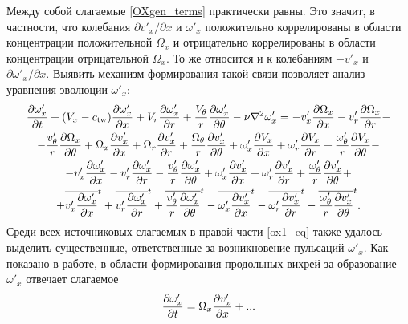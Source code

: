 Между собой слагаемые \eqref{OXgen_terms} практически равны. Это значит, в частности, что колебания $\partial v'_x / \partial x$ и $\omega'_x$ положительно коррелированы в области концентрации положительной $\Omega_x$ и отрицательно коррелированы в области концентрации отрицательной $\Omega_x$. То же относится и к колебаниям $-v'_x$ и $\partial \omega'_x / \partial x$. Выявить механизм формирования такой связи позволяет анализ уравнения эволюции $\omega'_x$:
\begin{multline}\label{ox1_eq}
\frac{\partial \omega'_x}{\partial t} + (V_x - c_\mathrm{tw})\frac{\partial \omega'_x}{\partial x} + V_r \frac{\partial \omega_x'}{\partial r} + \frac{V_\theta}{r} \frac{\partial \omega'_x}{\partial \theta} 
- \nu\nabla^2\omega'_x = - v'_x \frac{\partial \Omega_x}{\partial x} - v'_r \frac{\partial \Omega_x}{\partial r} - \\ - \frac{v'_\theta}{r} \frac{\partial \Omega_x}{\partial \theta} 
+ \Omega_x \frac{\partial v'_x}{\partial x} + \Omega_r \frac{\partial v'_x}{\partial r} + \frac{\Omega_\theta}{r} \frac{\partial v'_x}{\partial \theta}
+ \omega'_x \frac{\partial V_x}{\partial x} + \omega'_r \frac{\partial V_x}{\partial r} + \frac{\omega'_\theta}{r} \frac{\partial V_x}{\partial \theta} - \\ 
- v'_x \frac{\partial \omega'_x}{\partial x} - v'_r \frac{\partial \omega'_x}{\partial r} - \frac{v'_\theta}{r} \frac{\partial \omega'_x}{\partial \theta} 
+ \omega'_x \frac{\partial v'_x}{\partial x} + \omega'_r \frac{\partial v'_x}{\partial r} + \frac{\omega'_\theta}{r} \frac{\partial v'_x}{\partial \theta} + \\
+ \overline{v'_x \frac{\partial \omega'_x}{\partial x}}^t + \overline{v'_r \frac{\partial \omega'_x}{\partial r}}^t + \overline{\frac{v'_\theta}{r} \frac{\partial \omega'_x}{\partial \theta}}^t
- \overline{\omega'_x \frac{\partial v'_x}{\partial x}}^t - \overline{\omega'_r \frac{\partial v'_x}{\partial r}}^t - \overline{\frac{\omega'_\theta}{r} \frac{\partial v'_x}{\partial \theta}}^t.
\end{multline}
Среди всех источниковых слагаемых в правой части \eqref{ox1_eq} также удалось выделить существенные, ответственные за возникновение пульсаций $\omega'_x$. Как показано в работе, в области формирования продольных вихрей за образование $\omega'_x$ отвечает слагаемое
\begin{equation}\label{ox1gen_main_terms}
\frac{\partial \omega'_x}{\partial t} = \Omega_x \frac {\partial v'_x}{\partial x} + ...
\end{equation}
